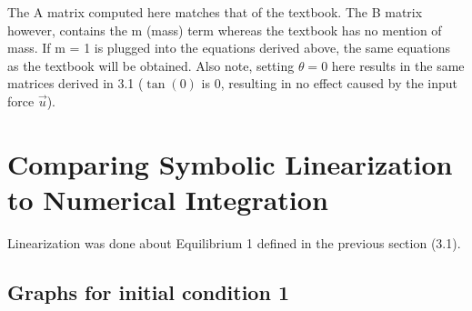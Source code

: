 \documentclass[10pt]{article}
\begin{document}
The A matrix computed here matches that of the textbook. The B matrix however, contains the m (mass) term whereas the textbook has no mention of mass. If m = 1 is plugged into the equations derived above, the same equations as the textbook will be obtained. Also note, setting $\theta = 0$ here results in the same matrices derived in 3.1 ($\tan(0)$ is 0, resulting in no effect caused by the input force $\vec{u}$). 

\section{Comparing Symbolic Linearization to Numerical Integration}
Linearization was done about Equilibrium 1 defined in the previous section (3.1).

\subsection{Graphs for initial condition 1}
\end{document}
